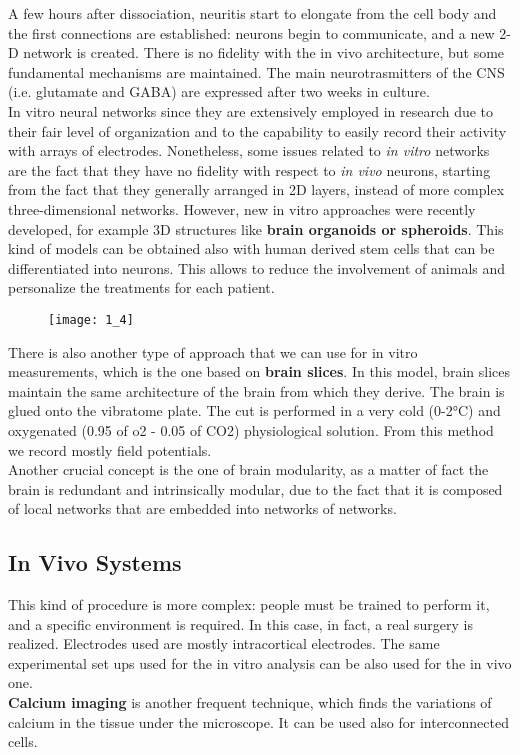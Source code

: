 A few hours after dissociation, neuritis start to elongate from the cell 
body and the first connections are established: neurons begin to 
communicate, and a new 2-D network is created. There is no fidelity with 
the in vivo architecture, but some fundamental mechanisms are maintained. 
The main neurotrasmitters of the CNS (i.e. glutamate and GABA) are 
expressed after two weeks in culture.\\

In vitro neural networks since they are extensively employed in research 
due to their fair level of organization and to the capability to easily
record their activity with arrays of electrodes. Nonetheless, some issues 
related to
\textit{in vitro} networks are the fact that they have no fidelity with 
respect to \textit{in vivo} neurons, starting from the fact that they 
generally arranged in 2D layers, instead of more complex three-dimensional 
networks.
However, new in vitro approaches were recently developed, for example 3D 
structures like \textbf{brain organoids or spheroids}. This kind of models 
can be obtained also with human derived stem cells that can be 
differentiated into neurons. This allows to reduce the involvement of 
animals and personalize the treatments for each patient.
\begin{figure}[H]
    \texttt{[image: 1\_4]}
    \centering
\end{figure}
There is also another type of approach that we can use for in vitro 
measurements, which is the one based on \textbf{brain slices}. In this 
model, brain slices maintain the same architecture of the brain from which 
they derive. The brain is glued onto the vibratome plate. The cut is 
performed in a very cold (0-2°C) and oxygenated (0.95 of o2 - 0.05 of CO2) 
physiological solution. From this method we record mostly field 
potentials.\\

Another crucial concept is the one of brain modularity, as a matter of 
fact the brain is redundant and intrinsically modular, due to the fact 
that it is composed of local networks that are embedded into networks of 
networks.\\

\subsection{In Vivo Systems}
This kind of procedure is more complex: people must be trained to perform 
it, and a specific environment is required. In this case, in fact, a real 
surgery is realized. 
Electrodes used are mostly intracortical electrodes. The same experimental 
set ups used for the in vitro analysis can be also used for the in vivo 
one.\\
\textbf{Calcium imaging} is another frequent technique, which finds the 
variations of calcium in the tissue under the microscope. It can be used 
also for interconnected cells. 

